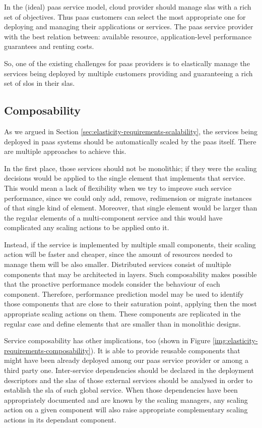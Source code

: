 In the (ideal) \ac{paas} service model, cloud provider should manage \ac{sla}s with a rich set of objectives.
Thus \ac{paas} customers can select the most appropriate one for deploying and managing their applications
or services. The \ac{paas} service provider with the best relation between: available resource,
application-level performance guarantees and renting costs.

So, one of the existing challenges for \ac{paas} providers is to elastically manage the services being
deployed by multiple customers providing and guaranteeing a rich set of \ac{slo}s in their \ac{sla}s.

\subsection{Composability}
\label{sec:elasticity-requirements-composability}
As we argued in Section \ref{sec:elasticity-requirements-scalability}, the services being deployed in
\ac{paas} systems should be automatically scaled by the \ac{paas} itself. There are multiple approaches
to achieve this.

In the first place, those services should not be monolithic; if they were the scaling decisions would
be applied to the single element that implements that service. This would mean a lack of flexibility
when we try to improve such service performance, since we could only add, remove, redimension or migrate
instances of that single kind of element. Moreover, that single element would be larger than the regular
elements of a multi-component service and this would have complicated any scaling actions to be applied
onto it.

Instead, if the service is implemented by multiple small components, their scaling action will be faster
and cheaper, since the amount of resources needed to manage them will be also smaller.
Distributed services consist of multiple components that may be architected in layers. Such composability
makes possible that the proactive performance models consider the behaviour of each component. Therefore,
performance prediction model may be used to identify those components that are close to their saturation
point, applying then the most appropriate scaling actions on them. These components are replicated in
the regular case and define elements that are smaller than in monolithic designs.

Service composability has other implications, too (shown in Figure \ref{img:elasticity-requirements-composability}).
It is able to provide reusable components that might have been already deployed among our \ac{paas} service provider
or among a third party one. Inter-service dependencies should be declared in the deployment descriptors and the
\ac{sla}s of those external services should be analysed in order to establish the \ac{sla} of such global service.
When those dependencies have been appropriately documented and are known by the scaling managers, any scaling
action on a given component will also raise appropriate complementary scaling actions in its dependant
component.

